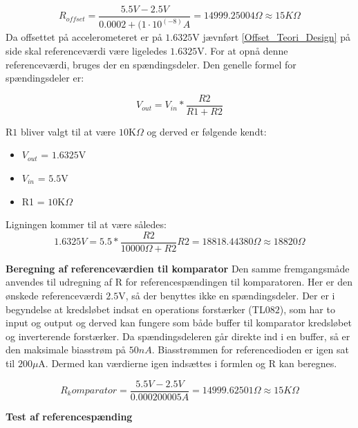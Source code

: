 \begin{equation}
R_{offset}=\frac{5.5V-2.5V}{0.0002 + (1 \cdot 10^(-8)A} = 14999.25004\Omega \approx 15K\Omega
\end{equation}  
Da offsettet på accelerometeret er på $1.6325$V jævnført \ref{Offset_Teori_Design} på side \pageref{Offset_Teori_Design} skal referenceværdi være ligeledes $1.6325$V. For at opnå denne referenceværdi, bruges der en spændingsdeler. Den genelle formel for spændingsdeler er: 

\begin{equation} \label{Spaendingsdeler}
V_{out}=V_{in}*\dfrac{R2}{R1+R2}
\end{equation}

R$1$ bliver valgt til at være $10$K$\Omega$ og derved er følgende kendt: 
\begin{itemize}
\item $V_{out}$  = $1.6325$V
\item $V_{in}$ = $5.5$V
\item R1 = $10$K$\Omega$
\end{itemize}
Ligningen kommer til at være således: 
\begin{equation}
1.6325V = 5.5* \dfrac{R2}{10000\Omega+R2} 
R2 = 18818.44380\Omega \approx 18820\Omega
\end{equation}

\noindent \textbf{Beregning af referenceværdien til komparator}
Den samme fremgangsmåde anvendes til udregning af R for referencespændingen til komparatoren. Her er den ønskede referenceværdi  $2.5$V, så der benyttes ikke en spændingsdeler. Der er i begyndelse at kredsløbet indsat en operations forstærker (TL$082$), som har to input og output og derved kan fungere som både buffer til komparator kredsløbet og inverterende forstærker. Da spændingsdeleren går direkte ind i en buffer, så er den maksimale biasstrøm på $50nA$. Biasstrømmen for referencedioden er igen sat til $200\mu$A. Dermed kan værdierne igen indsættes i formlen og R kan beregnes.

\begin{equation}
R_komparator = \frac{5.5V-2.5V}{0.000200005A} = 14999.62501\Omega \approx 15K\Omega 
\end{equation} 

\textbf{Test af referencespænding}

 